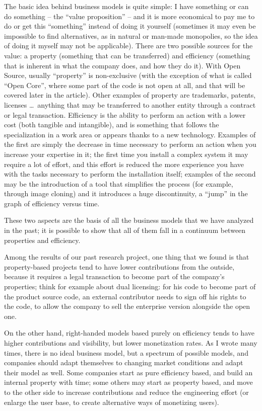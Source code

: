 The basic idea behind business models is quite simple: I have something or can
do something -- the ``value proposition'' -- and it is more economical to pay me to do or get this ``something'' instead of doing it yourself (sometimes it may even be impossible to find alternatives, as in natural or man-made monopolies, so the idea of doing it myself may not be applicable). 
There are two possible sources for the value: a property (something that can be
transferred) and efficiency (something that is inherent in what the company does, and how they do it). With Open Source, usually ``property'' is non-exclusive (with the exception of what is called ``Open Core'', where some part of the code is not open at all, and that will be covered later in the article). Other examples of property are trademarks, patents, licenses \dots\ anything that may be transferred to another entity through a contract or legal transaction.
Efficiency is the ability to perform an action with a lower cost (both tangible
and intangible), and is something that follows the specialization in a work area
or appears thanks to a new technology. Examples of the first are simply the
decrease in time necessary to perform an action when you increase your expertise
in it; the first time you install a complex system it may require a lot of effort, and this effort is reduced the more experience you have with the tasks necessary to perform the installation itself; examples of the second may be the introduction of a tool that simplifies the process (for example, through image cloning) and it introduces a huge discontinuity, a ``jump'' in the graph of efficiency versus time.

These two aspects are the basis of all the business models that we have analyzed
in the past; it is possible to show that all of them fall in a continuum between
properties and efficiency.

Among the results of our past research project, one thing that we found is that
property-based projects tend to have lower contributions from the outside,
because it requires a legal transaction to become part of the company's
properties; think for example about dual licensing: for his code to become part of the product source code, an external contributor needs to sign off his rights to the code, to allow the company to sell the enterprise version alongside the open one. 

On the other hand, right-handed models based purely on efficiency tends to have
higher contributions and visibility, but lower monetization rates. As I wrote
many times, there is no ideal business model, but a spectrum of possible models,
and companies should adapt themselves to changing market conditions and adapt
their model as well. Some companies start as pure efficiency based, and build an
internal property with time; some others may start as property based, and move
to the other side to increase contributions and reduce the engineering effort
(or enlarge the user base, to create alternative ways of monetizing users).

